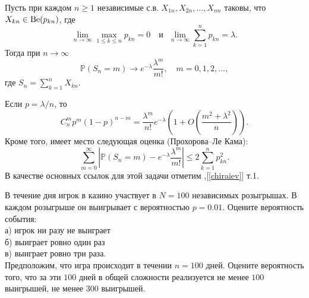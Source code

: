 \begin{problem}
Пусть при каждом $n\geqslant 1$ независимые с.в. $X_{1n}, X_{2n},\ldots, X_{nn}$ таковы, что $X_{kn}\in \mathrm{Be}(p_{kn})$, где 
$$\lim_{n\to\infty}\max\limits_{1\leqslant k\leqslant n} p_{kn}=0\quad\text{и ~} \lim_{n\to\infty}\sum\limits_{k=1}^{n}p_{kn}=\lambda.$$ 
Тогда при $n\to\infty$
\begin{equation*}
\label{TPois}
{\mathbb P}(S_n=m)\to  e^{-\lambda}\frac{\lambda^m}{m!}, \quad m=0,1,2,\ldots, 
\end{equation*}
 где $S_n=\sum\limits_{k=1}^{n} X_{kn}$. 
\begin{remark}
Если $p=\lambda/n$, то $$C_{n}^{m}p^{m}(1-p)^{n-m} = \frac{\lambda^m}{n!}e^{-\lambda}\left( 1 + O\left(\frac{m^2+\lambda^2}{n}\right)\right).$$
Кроме того, имеет место следующая оценка (Прохорова--Ле Кама): 
$$\sum_{m=0}^{\infty}{\left|\mathbb P(S_n=m) - e^{-\lambda}\frac{\lambda^{m}}{m!}\right|} \leq 2 \sum_{k=1}^{n}{p_{kn}^2}.$$
В качестве основных ссылок для этой задачи отметим \cite{19},[\ref{chiraiev}] т.1.
\end{remark}
\end{problem}

\begin{problem}
В течение дня игрок в казино участвует в $N=100$ независимых розыгрышах. В каждом розыгрыше он выигрывает с вероятностью 
$p=0.01$. Оцените вероятность события:\\
\indent а) игрок ни разу не выиграет\\
\indent б) выиграет ровно один раз \\
\indent в) выиграет ровно три раза.\\

Предположим, что игра происходит в течении $n=100$ дней. 
Оцените вероятность того, что за эти $100$ дней в общей сложности реализуется не менее $100$ выигрышей, не менее $300$ выигрышей. 


\end{problem}

